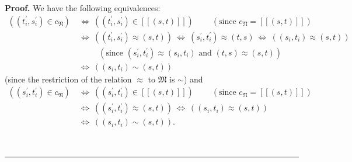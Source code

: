 \documentclass[numbers=enddot,12pt,final,onecolumn,notitlepage,abstracton]{scrartcl}%
\theoremstyle{definition}
\newenvironment{proof}[1][Proof]{\noindent\textbf{#1.} }{\ \rule{0.5em}{0.5em}}
\begin{document}
\begin{proof}
We have the following equivalences:%
\begin{align}
\left(  \left(  t_{i}^{\prime},s_{i}^{\prime}\right)  \in c_{\mathfrak{N}%
}\right)  \  &  \Longleftrightarrow\ \left(  \left(  t_{i}^{\prime}%
,s_{i}^{\prime}\right)  \in\left[  \left[  \left(  s,t\right)  \right]
\right]  \right)  \ \ \ \ \ \ \ \ \ \ \left(  \text{since }c_{\mathfrak{N}%
}=\left[  \left[  \left(  s,t\right)  \right]  \right]  \right) \nonumber\\
&  \Longleftrightarrow\ \left(  \left(  t_{i}^{\prime},s_{i}^{\prime}\right)
\approx\left(  s,t\right)  \right)  \ \Longleftrightarrow\ \left(
s_{i}^{\prime},t_{i}^{\prime}\right)  \approx\left(  t,s\right)
\ \Longleftrightarrow\ \left(  \left(  s_{i},t_{i}\right)  \approx\left(
s,t\right)  \right) \nonumber\\
&  \ \ \ \ \ \ \ \ \ \ \ \left(  \text{since }\left(  s_{i}^{\prime}%
,t_{i}^{\prime}\right)  \approx\left(  s_{i},t_{i}\right)  \text{ and }\left(
t,s\right)  \approx\left(  s,t\right)  \right) \nonumber\\
&  \Longleftrightarrow\ \left(  \left(  s_{i},t_{i}\right)  \sim\left(
s,t\right)  \right)  \label{pf.thm.BCL.b.hasdiff1.pf.equiv1}%
\end{align}
(since the restriction of the relation $\approx$ to $\mathfrak{M}$ is $\sim$)
and%
\begin{align}
\left(  \left(  s_{i}^{\prime},t_{i}^{\prime}\right)  \in c_{\mathfrak{N}%
}\right)  \  &  \Longleftrightarrow\ \left(  \left(  s_{i}^{\prime}%
,t_{i}^{\prime}\right)  \in\left[  \left[  \left(  s,t\right)  \right]
\right]  \right)  \ \ \ \ \ \ \ \ \ \ \left(  \text{since }c_{\mathfrak{N}%
}=\left[  \left[  \left(  s,t\right)  \right]  \right]  \right) \nonumber\\
&  \Longleftrightarrow\ \left(  \left(  s_{i}^{\prime},t_{i}^{\prime}\right)
\approx\left(  s,t\right)  \right)  \ \Longleftrightarrow\ \left(  \left(
s_{i},t_{i}\right)  \approx\left(  s,t\right)  \right) \nonumber\\
&  \Longleftrightarrow\ \left(  \left(  s_{i},t_{i}\right)  \sim\left(
s,t\right)  \right)  . \label{pf.thm.BCL.b.hasdiff1.pf.equiv2}%
\end{align}



\end{proof}
\end{document}
